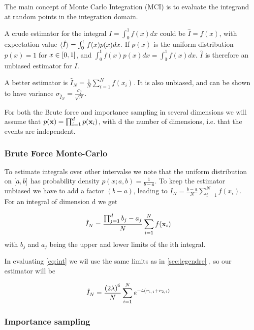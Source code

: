 The main concept of Monte Carlo Integration (MCI) is to evaluate the integrand
at random points in the integration domain.

A crude estimator for the integral $ I = \int_{0}^{1} f(x)dx $ could be $
\hat{I} = f(x)$, with expectation value $\braket{\hat{I}} = \int_{0}^{1}
f(x)p(x)dx$. If $p(x)$ is the uniform distribution $p(x) = 1$ for $x \in
\left[0,1\right]$, and $\int_{0}^{1} f(x)p(x) dx = \int_{0}^{1}f(x) dx$. $\hat{I}$ is
therefore an unbiased estimator for $I$.

A better estimator is $\hat{I}_N = \frac{1}{N}\sum_{i=1}^{N} f(x_i)$. It is also
unbiased, and can be shown to have variance
$\sigma_{\hat{I}_N} = \frac{\sigma_{\hat{I}}}{\sqrt{N}}$.

For both the Brute force and importance sampling in several dimensions we will
assume that $p(\mathbf{x}) = \prod_{i=1}^{d} p(\mathbf{x}_i)$, with d the number of dimensions,
i.e. that the events are independent.

\subsubsection{Brute Force Monte-Carlo}

To estimate integrals over other intervalse we note that the uniform
distribution on $\left[a,b\right]$ has probability density $p(x;a,b) = \frac{1}{b-a}$.
To keep the estimator unbiased we have to add a factor $(b-a)$, leading to
$\hat{I}_N = \frac{b-a}{N}\sum_{i=1}^{N}f(x_i)$.
For an integral of dimension d we get

\begin{equation}
  \label{eq:estimator_brute}
  \hat{I}_N
  = \frac{\prod_{j=1}^{d} b_j - a_j }{N}\sum_{i=1}^{N} f(\mathbf{x}_i)
\end{equation}
with $b_j$ and $a_j$ being the upper and lower limits of the ith integral.

In evaluating \cref{eq:int} we wil use the same limits as in \cref{sec:legendre}
, so our estimator will be

\begin{equation}
  \label{eq:estimator_brute_our}
  \hat{I}_N
  = \frac{\left(2\lambda\right)^6}{N} \sum_{i=1}^{N} e^{-4(r_{1,i} + r_{2,i})}
\end{equation}

\subsubsection{Importance sampling}

